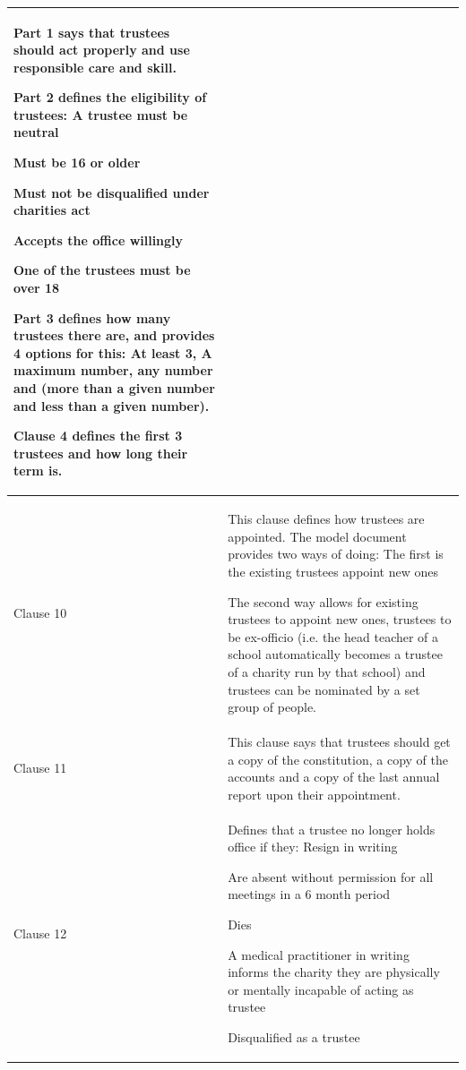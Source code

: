 \documentclass{UoYCSproject}
\begin{document}
\begin{longtable}{|p{}|p{}|}
Part 1 says that trustees should act properly and use responsible care and skill.

Part 2 defines the eligibility of trustees:
A trustee must be neutral

Must be 16 or older

Must not be disqualified under charities act

Accepts the office willingly

One of the trustees must be over 18


Part 3 defines how many trustees there are, and provides 4 options for this: At least 3, A maximum number, any number and (more than a given number and less than a given number).

Clause 4 defines the first 3 trustees and how long their term is. \\\hline
  Clause 10 & 
          This clause defines how trustees are appointed. The model document provides two ways of doing:
The first is the existing trustees appoint new ones

The second way allows for existing trustees to appoint new ones, trustees to be ex-officio (i.e. the head teacher of a school automatically becomes a trustee of a charity run by that school) and trustees can be nominated by a set group of people. \\\hline
  Clause 11 & 
          This clause says that trustees should get a copy of the constitution, a copy of the accounts and a copy of the last annual report upon their appointment. \\\hline
  Clause 12 & 
          Defines that a trustee no longer holds office if they:
Resign in writing

Are absent without permission for all meetings in a 6 month period

Dies

A medical practitioner in writing informs the charity they are physically or mentally incapable of acting as trustee

Disqualified as a trustee


\end{longtable}
\end{document}
